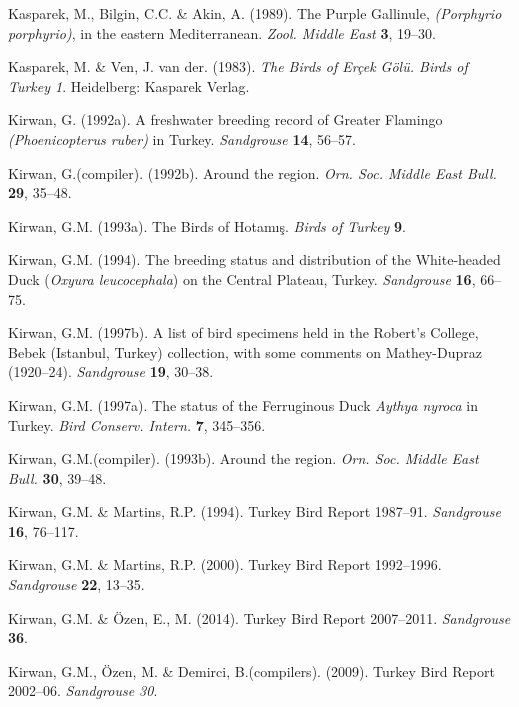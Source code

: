 \documentclass[
  a4paper,
  DIV=11,
  numbers=noendperiod]{scrreprt}
\newlength{\cslhangindent}
\newenvironment{CSLReferences}[2] %
 {\begin{list}{}{%
  \setlength{\itemindent}{0pt}
  \setlength{\leftmargin}{0pt}
  \setlength{\parsep}{0pt}
  \ifodd #1
   \setlength{\leftmargin}{\cslhangindent}
   \setlength{\itemindent}{-1\cslhangindent}
  \fi
  \setlength{\itemsep}{#2\baselineskip}}}
 {\end{list}}
\begin{document}
\begin{CSLReferences}{1}{1}
Kasparek, M., Bilgin, C.C. \& Akin, A. (1989). {The Purple Gallinule,
\emph{(Porphyrio porphyrio)}, in the eastern Mediterranean}. \emph{Zool.
Middle East} \textbf{3}, 19--30.

Kasparek, M. \& Ven, J. van der. (1983). \emph{{The Birds of Erçek Gölü.
Birds of Turkey 1}}. Heidelberg: Kasparek Verlag.

Kirwan, G. (1992a). {A freshwater breeding record of Greater Flamingo
\emph{(Phoenicopterus ruber)} in Turkey}. \emph{Sandgrouse} \textbf{14},
56--57.

Kirwan, G.(compiler). (1992b). {Around the region}. \emph{Orn. Soc.
Middle East Bull.} \textbf{29}, 35--48.

Kirwan, G.M. (1993a). {The Birds of Hotamış}. \emph{Birds of Turkey}
\textbf{9}.

Kirwan, G.M. (1994). {The breeding status and distribution of the
White-headed Duck (\emph{Oxyura leucocephala}) on the Central Plateau,
Turkey}. \emph{Sandgrouse} \textbf{16}, 66--75.

Kirwan, G.M. (1997b). {A list of bird specimens held in the Robert's
College, Bebek (Istanbul, Turkey) collection, with some comments on
Mathey-Dupraz (1920--24)}. \emph{Sandgrouse} \textbf{19}, 30--38.

Kirwan, G.M. (1997a). {The status of the Ferruginous Duck \emph{Aythya
nyroca} in Turkey}. \emph{Bird Conserv. Intern.} \textbf{7}, 345--356.

Kirwan, G.M.(compiler). (1993b). {Around the region}. \emph{Orn. Soc.
Middle East Bull.} \textbf{30}, 39--48.

Kirwan, G.M. \& Martins, R.P. (1994). {Turkey Bird Report 1987--91}.
\emph{Sandgrouse} \textbf{16}, 76--117.

Kirwan, G.M. \& Martins, R.P. (2000). {Turkey Bird Report 1992--1996}.
\emph{Sandgrouse} \textbf{22}, 13--35.

Kirwan, G.M. \& Özen, E., M. (2014). {Turkey Bird Report 2007--2011}.
\emph{Sandgrouse} \textbf{36}.

Kirwan, G.M., Özen, M. \& Demirci, B.(compilers). (2009). {Turkey Bird
Report 2002--06}. \emph{Sandgrouse 30}.


\end{CSLReferences}
\end{document}
